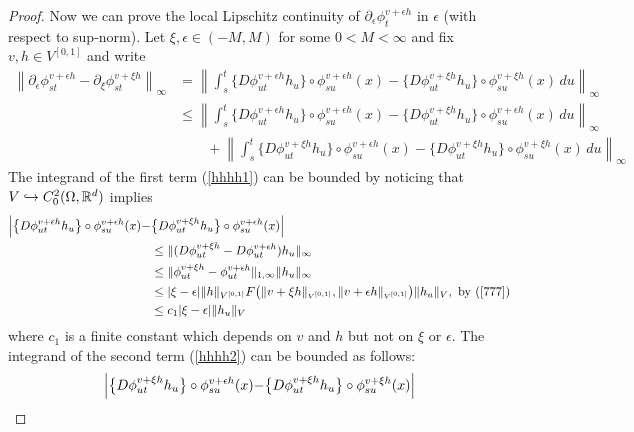\documentclass[noinfoline]{imsart}
\begin{document}
\begin{proof}
{    Now we can prove the local Lipschitz continuity of  ${\partial_\epsilon}  \phi^{ v+\epsilon h}_t  $ in $\epsilon$  (with respect to sup-norm). Let $\xi, \epsilon\in (-M, M)$ for some $0<M<\infty$ and fix $v,h\in V^{[0,1]}$ and write
\begin{align}
\left \| \partial_\epsilon  \phi^{ v+\epsilon h}_{st} -  \partial_\xi   \phi^{ v+\xi h}_{st}  \right\|_{\infty} & = \left \| \int_s^t  \bigl\{D\phi^{ v+\epsilon h}_{ut} h_u \bigr\}\circ{\phi^{v+\epsilon h}_{su}(x)}-  \bigl\{D\phi^{v+\xi h}_{ut} h_u \bigr\}\circ{\phi^{v+\xi h}_{su}(x)}\,   du    \right\|_{\infty}\nonumber \\
& \leq  \left\| \int_s^t  \bigl\{D\phi^{ v+\epsilon h}_{ut} h_u \bigr\}\circ{\phi^{ v+\epsilon h}_{su}(x)}-  \bigl\{D\phi^{ v+\xi h }_{ut} h_u \bigr\}\circ{\phi^{v+\epsilon h}_{su}(x)}\,   du    \right\|_{\infty}\label{hhhh1}  \\
& \qquad+ \left\| \int_s^t  \bigl\{D\phi^{v+\xi h}_{ut} h_u \bigr\}\circ{\phi^{v+\epsilon h}_{su}(x)}-  \bigl\{D\phi^{v+\xi h}_{ut} h_u \bigr\}\circ{\phi^{ v+\xi h}_{su}(x)}\,   du    \right\|_{\infty}  \label{hhhh2}
\end{align}
The integrand of the first  term (\ref{hhhh1}) can be bounded by noticing that   $V\hookrightarrow C_0^{2}(\Omega, \Bbb R^d)$ implies
\begin{align}
  \Bigl| \bigl\{D\phi^{ v+\epsilon h}_{ut} h_u \bigr\}\circ{\phi^{ v+\epsilon h}_{su}(x)}- & \bigl\{D\phi^{ v+\xi h }_{ut} h_u \bigr\}\circ{\phi^{v+\epsilon h}_{su}(x)}\Bigr| \nonumber\\
  &\leq \|  (D\phi_{ut}^{ v+\xi h} -D \phi_{ut}^{ v+\epsilon h})h_u   \|_\infty  \nonumber\\
  &\leq  \|  \phi_{ut}^{ v+\xi h} - \phi_{ut}^{v+\epsilon h}  \|_{1,\infty}  \| h_u\|_{\infty} \nonumber\\
&\leq |\xi -\epsilon| \|  h  \|_{V^{[0,1]}}  F\bigl( {\|v+\xi h\|_\text{\tiny $V^{[0,1]}$}},{\|v+\epsilon h\|_\text{\tiny $V^{[0,1]}$}}\bigr)   \| h_u\|_{V},\,\,\text{by (\ref{777})} \nonumber\\
&\leq c_1 |\xi -\epsilon|   \| h_u\|_{V}
\label{uuuu}
\end{align}
where $c_1$ is a finite constant which depends on $v$ and $h$ but not on   $\xi$ or $\epsilon$.
The integrand of the second term  (\ref{hhhh2}) can be bounded as follows:
\begin{align}
 \Bigr|\bigl\{D\phi^{v+\xi h}_{ut} h_u \bigr\}\circ{\phi^{v+\epsilon h}_{su}(x)}-  &\bigl\{D\phi^{v+\xi h}_{ut} h_u \bigr\}\circ{\phi^{ v+\xi h}_{su}(x)}\Bigl| \nonumber   \\

\end{align}}
\end{proof}
\end{document}
